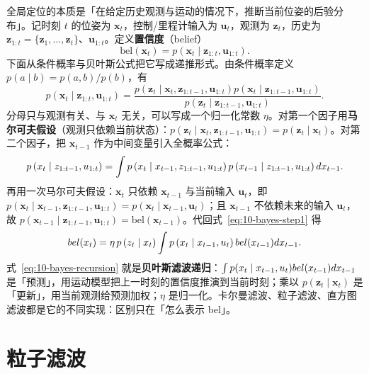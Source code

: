 全局定位的本质是「在给定历史观测与运动的情况下，推断当前位姿的后验分布」。记时刻 $t$ 的位姿为 $\bm{x}_t$，控制/里程计输入为 $\bm{u}_t$，观测为 $\bm{z}_t$，历史为 $\bm{z}_{1:t}=\{\bm{z}_1,\dots,\bm{z}_t\}$、$\bm{u}_{1:t}$。定义\textbf{置信度}（belief）
\begin{equation}
  \mathrm{bel}(\bm{x}_t) = p\left(\bm{x}_t\mid\bm{z}_{1:t},\bm{u}_{1:t}\right).
  \label{eq:10-belief}
\end{equation}
下面从条件概率与贝叶斯公式把它写成递推形式。由条件概率定义 $p(a\mid b)=p(a,b)/p(b)$，有
\begin{equation}
  p\left(\bm{x}_t\mid\bm{z}_{1:t},\bm{u}_{1:t}\right)
  = \frac{p\left(\bm{z}_t\mid\bm{x}_t,\bm{z}_{1:t-1},\bm{u}_{1:t}\right)
    p\left(\bm{x}_t\mid\bm{z}_{1:t-1},\bm{u}_{1:t}\right)}
  {p\left(\bm{z}_t\mid\bm{z}_{1:t-1},\bm{u}_{1:t}\right)}.
  \label{eq:10-bayes-step1}
\end{equation}
分母只与观测有关、与 $\bm{x}_t$ 无关，可以写成一个归一化常数 $\eta$。对第一个因子用\textbf{马尔可夫假设}（观测只依赖当前状态）：$p(\bm{z}_t\mid\bm{x}_t,\bm{z}_{1:t-1},\bm{u}_{1:t})=p(\bm{z}_t\mid\bm{x}_t)$。对第二个因子，把 $\bm{x}_{t-1}$ 作为中间变量引入全概率公式：
\begin{equation}
  p\left(x_t\mid z_{1:t-1},u_{1:t}\right)
  = \int p\left(x_t\mid x_{t-1},z_{1:t-1},u_{1:t}\right)
    p\left(x_{t-1}\mid z_{1:t-1},u_{1:t}\right)dx_{t-1}.
\end{equation}
再用一次马尔可夫假设：$\bm{x}_t$ 只依赖 $\bm{x}_{t-1}$ 与当前输入 $\bm{u}_t$，即 $p(\bm{x}_t\mid\bm{x}_{t-1},\bm{z}_{1:t-1},\bm{u}_{1:t})=p(\bm{x}_t\mid\bm{x}_{t-1},\bm{u}_t)$；且 $\bm{x}_{t-1}$ 不依赖未来的输入 $\bm{u}_t$，故 $p(\bm{x}_{t-1}\mid\bm{z}_{1:t-1},\bm{u}_{1:t})=\mathrm{bel}(\bm{x}_{t-1})$。代回式~\eqref{eq:10-bayes-step1} 得
\begin{equation}
  bel(x_t)
  = \eta\,p\left(z_t\mid x_t\right)
  \int p\left(x_t\mid x_{t-1},u_t\right)bel(x_{t-1})dx_{t-1}.
  \label{eq:10-bayes-recursion}
\end{equation}
式~\eqref{eq:10-bayes-recursion} 就是\textbf{贝叶斯滤波递归}：$\int p(x_t\mid x_{t-1},u_t)bel(x_{t-1})dx_{t-1}$ 是「预测」，用运动模型把上一时刻的置信度推演到当前时刻；乘以 $p(\bm{z}_t\mid\bm{x}_t)$ 是「更新」，用当前观测给预测加权；$\eta$ 是归一化。卡尔曼滤波、粒子滤波、直方图滤波都是它的不同实现：区别只在「怎么表示 bel」。

\section{粒子滤波}\label{sec:10-pf}

